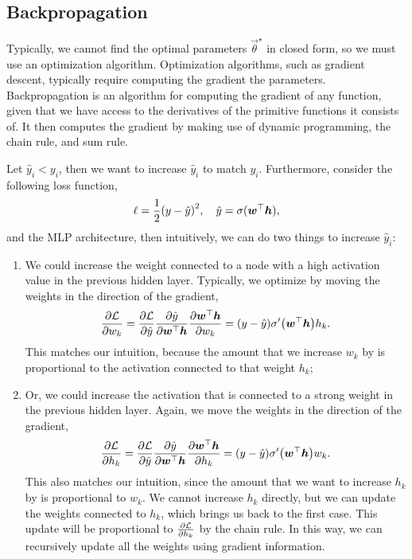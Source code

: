\subsection{Backpropagation}

Typically, we cannot find the optimal parameters $\vec{\theta}^\star$ in closed form, so we must
use an optimization algorithm. Optimization algorithms, such as gradient descent, typically require
computing the gradient \wrt the parameters. Backpropagation is an algorithm for computing the
gradient of any function, given that we have access to the derivatives of the primitive functions
it consists of. It
then computes the gradient by making use of dynamic programming, the chain rule, and sum rule.

Let $\hat{y}_i < y_i$, then we want to increase $\hat{y}_i$ to match $y_i$. Furthermore, consider
the following loss function, \[
    \ell = \frac{1}{2} \lft( y - \hat{y} \rgt)^2, \quad \hat{y} = \sigma(\transpose{\vec{w}} \vec{h}),
\]
and the MLP architecture, then intuitively, we can do two things to increase $\hat{y}_i$:
\begin{enumerate}
    \item We could increase the weight connected to a node with a high activation value in the previous
          hidden layer. Typically, we optimize by moving the weights in the direction of the gradient, \[
              \pdv{\mathcal{L}}{w_k} = \pdv{\mathcal{L}}{\hat{y}} \pdv{\hat{y}}{\transpose{\vec{w}} \vec{h}} \pdv{\transpose{\vec{w}} \vec{h}}{w_k} = (y - \hat{y}) \sigma'\lft(\transpose{\vec{w}} \vec{h} \rgt) h_k.
          \]
          This matches our intuition, because the amount that we increase $w_k$ by is proportional to the
          activation connected to that weight $h_k$;

    \item Or, we could increase the activation that is connected to a strong weight in the previous hidden
          layer. Again, we move the weights in the direction of the gradient, \[
              \pdv{\mathcal{L}}{h_k} = \pdv{\mathcal{L}}{\hat{y}} \pdv{\hat{y}}{\transpose{\vec{w}} \vec{h}} \pdv{\transpose{\vec{w}} \vec{h}}{h_k} = (y - \hat{y}) \sigma' \lft( \transpose{\vec{w}} \vec{h} \rgt) w_k.
          \]
          This also matches our intuition, since the amount that we want to increase $h_k$ by is proportional
          to $w_k$. We cannot increase $h_k$ directly, but we can update the weights connected to $h_k$,
          which brings us back to the first case. This update will be proportional to
          $\pdv{\mathcal{L}}{h_k}$ by the chain rule. In this way, we can recursively update all the weights
          using gradient information.

\end{enumerate}

